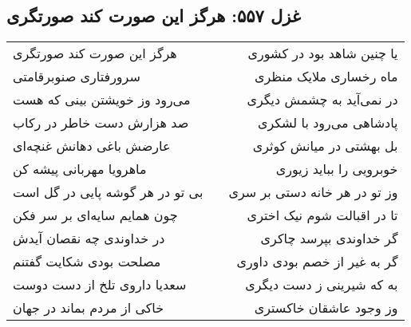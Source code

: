 \begin{center}
\section*{غزل ۵۵۷: هرگز این صورت کند صورتگری}
\label{sec:557}
\begin{longtable}{l p{0.5cm} r}
هرگز این صورت کند صورتگری
&&
یا چنین شاهد بود در کشوری
\\
سرورفتاری صنوبرقامتی
&&
ماه رخساری ملایک منظری
\\
می‌رود وز خویشتن بینی که هست
&&
در نمی‌آید به چشمش دیگری
\\
صد هزارش دست خاطر در رکاب
&&
پادشاهی می‌رود با لشکری
\\
عارضش باغی دهانش غنچه‌ای
&&
بل بهشتی در میانش کوثری
\\
ماهرویا مهربانی پیشه کن
&&
خوبرویی را بباید زیوری
\\
بی تو در هر گوشه پایی در گل است
&&
وز تو در هر خانه دستی بر سری
\\
چون همایم سایه‌ای بر سر فکن
&&
تا در اقبالت شوم نیک اختری
\\
در خداوندی چه نقصان آیدش
&&
گر خداوندی بپرسد چاکری
\\
مصلحت بودی شکایت گفتنم
&&
گر به غیر از خصم بودی داوری
\\
سعدیا داروی تلخ از دست دوست
&&
به که شیرینی ز دست دیگری
\\
خاکی از مردم بماند در جهان
&&
وز وجود عاشقان خاکستری
\\
\end{longtable}
\end{center}
